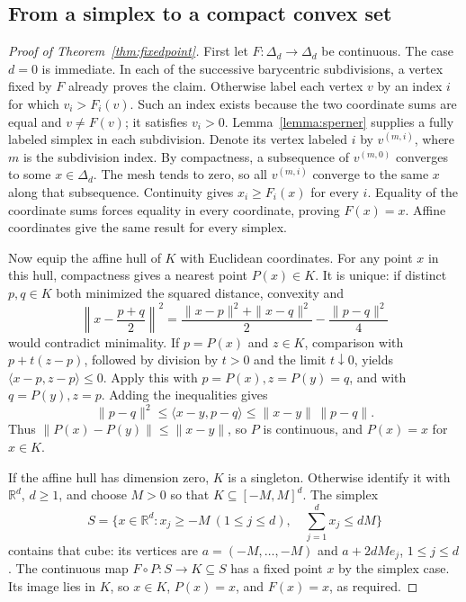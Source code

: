 \documentclass[11pt]{amsart}
\theoremstyle{definition}
\theoremstyle{remark}
\numberwithin{equation}{section}
\begin{document}
\subsection{From a simplex to a compact convex set}

\begin{proof}[Proof of Theorem~\ref{thm:fixedpoint}]
First let \(F:\Delta_d\to\Delta_d\) be continuous. The case
\(d=0\) is immediate. In each of the successive barycentric
subdivisions, a vertex fixed by \(F\) already proves the claim.
Otherwise label each vertex \(v\) by an index \(i\) for which
\(v_i>F_i(v)\). Such an index exists because the two coordinate
sums are equal and \(v\ne F(v)\); it satisfies \(v_i>0\).
Lemma~\ref{lemma:sperner} supplies a fully labeled simplex in each
subdivision. Denote its vertex labeled \(i\) by \(v^{(m,i)}\),
where \(m\) is the subdivision index. By compactness, a subsequence
of \(v^{(m,0)}\) converges to some \(x\in\Delta_d\).
The mesh tends to zero, so all \(v^{(m,i)}\) converge to the same
\(x\) along that subsequence. Continuity gives
\(x_i\ge F_i(x)\) for every \(i\). Equality of the coordinate
sums forces equality in every coordinate, proving \(F(x)=x\).
Affine coordinates give the same result for every simplex.

Now equip the affine hull of \(K\) with Euclidean coordinates.
For any point \(x\) in this hull, compactness gives a nearest
point \(P(x)\in K\). It is unique: if distinct \(p,q\in K\)
both minimized the squared distance, convexity and
\[
 \left\|x-\frac{p+q}{2}\right\|^2
 =\frac{\|x-p\|^2+\|x-q\|^2}{2}
  -\frac{\|p-q\|^2}{4}
\]
would contradict minimality. If \(p=P(x)\) and \(z\in K\),
comparison with \(p+t(z-p)\), followed by division by \(t>0\)
and the limit \(t\downarrow0\), yields
\(\langle x-p,z-p\rangle\le0\).
Apply this with \(p=P(x),z=P(y)=q\), and with \(q=P(y),z=p\).
Adding the inequalities gives
\[
 \|p-q\|^2\le\langle x-y,p-q\rangle
              \le\|x-y\|\,\|p-q\|.
\]
Thus \(\|P(x)-P(y)\|\le\|x-y\|\), so \(P\) is continuous,
and \(P(x)=x\) for \(x\in K\).

If the affine hull has dimension zero, \(K\) is a singleton.
Otherwise identify it with \(\mathbb R^d\), \(d\ge1\), and choose
\(M>0\) so that \(K\subseteq[-M,M]^d\). The simplex
\[
 S=\{x\in\mathbb R^d:x_j\ge-M\ (1\le j\le d),\quad
                         \sum_{j=1}^d x_j\le dM\}
\]
contains that cube: its vertices are
\(a=(-M,\ldots,-M)\) and \(a+2dM e_j\), \(1\le j\le d\).
The continuous map \(F\circ P:S\to K\subseteq S\) has a fixed
point \(x\) by the simplex case. Its image lies in \(K\), so
\(x\in K\), \(P(x)=x\), and \(F(x)=x\), as required.
\end{proof}



\end{document}
